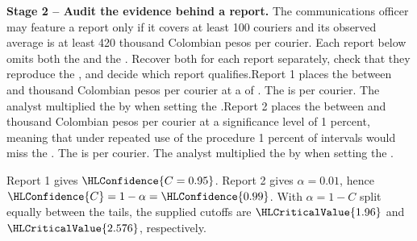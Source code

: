 \textbf{Stage 2 -- Audit the evidence behind a report.} The communications officer may feature a report only if it covers at least 100 couriers and its observed average is at least 420 thousand Colombian pesos per courier. Each report below omits both the   and the  . Recover both for each report separately, check that they reproduce the , and decide which report qualifies.\newline Report 1 places the  between  and  thousand Colombian pesos per courier at a  of . The   is   per courier. The analyst multiplied the   by  when setting the   .\newline Report 2 places the  between  and  thousand Colombian pesos per courier at a significance level of 1 percent, meaning that under repeated use of the procedure 1 percent of intervals would miss the . The   is   per courier. The analyst multiplied the   by  when setting the   .
\par\endgroup

Report 1 gives $\HLConfidence{C=0.95}$. Report 2 gives $\alpha=0.01$, hence $\HLConfidence{C}=1-\alpha=\HLConfidence{0.99}$. With $\alpha=1-C$ split equally between the tails, the supplied cutoffs are $\HLCriticalValue{1.96}$ and $\HLCriticalValue{2.576}$, respectively.

